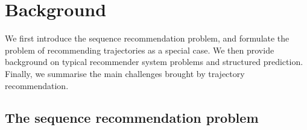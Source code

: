 

\section{Background}


We first introduce the sequence recommendation problem,
and formulate the problem of recommending trajectories as a special case.
We then provide background on typical recommender system problems and structured prediction.
Finally, we summarise the main challenges brought by trajectory recommendation.



\subsection{The sequence recommendation problem}

